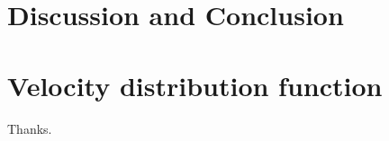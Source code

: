 \documentclass[10pt,twocolumn,preprint]{emulateapj}
\begin{document}
\section{Discussion and Conclusion}

\appendix
\section{Velocity distribution function}




\acknowledgements
Thanks.



\end{document}
